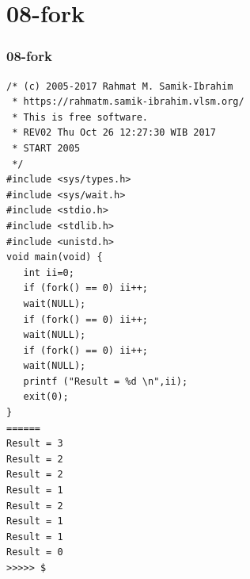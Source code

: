 \documentclass[xcolor=table, notheorems, hyperref={pdfpagelabels=false}]{beamer}
\begin{document}
\section{08-fork}
\begin{frame}[fragile]
\frametitle{08-fork}
\begin{lstlisting}[basicstyle=\ttfamily\tiny]
/* (c) 2005-2017 Rahmat M. Samik-Ibrahim
 * https://rahmatm.samik-ibrahim.vlsm.org/
 * This is free software.
 * REV02 Thu Oct 26 12:27:30 WIB 2017
 * START 2005
 */
#include <sys/types.h>
#include <sys/wait.h>
#include <stdio.h>
#include <stdlib.h>
#include <unistd.h>
void main(void) {
   int ii=0;
   if (fork() == 0) ii++;
   wait(NULL);
   if (fork() == 0) ii++;
   wait(NULL);
   if (fork() == 0) ii++;
   wait(NULL);
   printf ("Result = %d \n",ii);
   exit(0);
}
======
Result = 3 
Result = 2 
Result = 2 
Result = 1 
Result = 2 
Result = 1 
Result = 1 
Result = 0 
>>>>> $ 

\end{lstlisting}
\end{frame}

\end{document}
